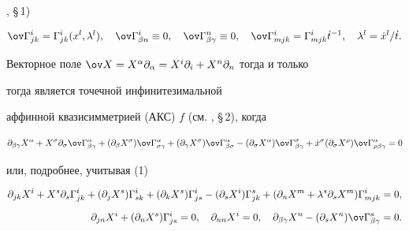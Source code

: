 \cite{4}, \S\,1) 


\begin{equation} 


\ov\Gamma^i_{jk}=\Gamma^i_{jk}(x^l,\lambda^l),\quad 


\ov\Gamma^i_{\beta n}\equiv0,\quad 


\ov\Gamma^n_{\beta\gamma}\equiv0,\quad


\ov\Gamma^i_{m j k}=\Gamma^i_{m j k}\Dot t^{-1},\quad 


\lambda^l=\Dot x^l/\Dot t. 


\end{equation} 


 


Векторное поле $\ov 


X=X^\alpha\partial_\alpha=X^i\partial_i+X^n\partial_n$ тогда и только 


тогда является точечной инфинитезимальной 


аффинной квазисимметрией (АКС) $f$ (см. \cite{4}, \S\,2), когда 


$$ 


\partial_{\beta\gamma}X^\alpha+X^\sigma\partial_\sigma 


\ov\Gamma^\alpha_{\beta\gamma}+(\partial_\beta X^\sigma) 


\ov\Gamma^\alpha_{\sigma\gamma}+ 


(\partial_\gamma X^\sigma)\ov\Gamma^\alpha_{\beta\sigma}- 


(\partial_\sigma X^\alpha)\ov\Gamma^\sigma_{\beta\gamma}+ 


\Dot x^\sigma(\partial_\sigma X^\rho) 


\ov\Gamma^\alpha_{\rho\beta\gamma}=0 


$$ 


или, подробнее, учитывая (1) 


\begin{equation} 


\begin{split} 


\partial_{j k}X^i+X^s\partial_s\Gamma^i_{j k}+ 


(\partial_j X^s)\Gamma^i_{s k}+ 


(\partial_k X^s)\Gamma^i_{j s}- 


(\partial_s X^i)\Gamma^s_{j k}+ 


(\partial_n X^m+\lambda^s\partial_s X^m) 


\Gamma^i_{m j k}&=0,\\[2mm] 


%


\partial_{j n}X^i+(\partial_n X^s)\Gamma^i_{j s}=0,\quad


\partial_{n n}X^i=0,\quad


\partial_{\beta\gamma}X^n-(\partial_s X^n) 


\ov\Gamma^s_{\beta\gamma}&=0. 


\end{split} 


\end{equation} 


